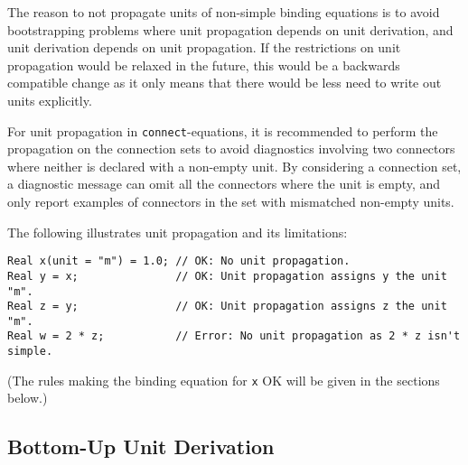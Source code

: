 \begin{nonnormative}
The reason to not propagate units of non-simple binding equations is to avoid bootstrapping problems where unit propagation depends on unit derivation, and unit derivation depends on unit propagation.
If the restrictions on unit propagation would be relaxed in the future, this would be a backwards compatible change as it only means that there would be less need to write out units explicitly.
\end{nonnormative}

\begin{nonnormative}
For unit propagation in \lstinline!connect!-equations, it is recommended to perform the propagation on the connection sets to avoid diagnostics involving two connectors where neither is declared with a non-empty unit.
By considering a connection set, a diagnostic message can omit all the connectors where the unit is empty, and only report examples of connectors in the set with mismatched non-empty units.
\end{nonnormative}

\begin{example}
The following illustrates unit propagation and its limitations:
\begin{lstlisting}[language=modelica]
Real x(unit = "m") = 1.0; // OK: No unit propagation.
Real y = x;               // OK: Unit propagation assigns y the unit "m".
Real z = y;               // OK: Unit propagation assigns z the unit "m".
Real w = 2 * z;           // Error: No unit propagation as 2 * z isn't simple.
\end{lstlisting}
(The rules making the binding equation for \lstinline!x! OK will be given in the sections below.)
\end{example}


\subsection{Bottom-Up Unit Derivation}\label{bottom-up-unit-derivation}

